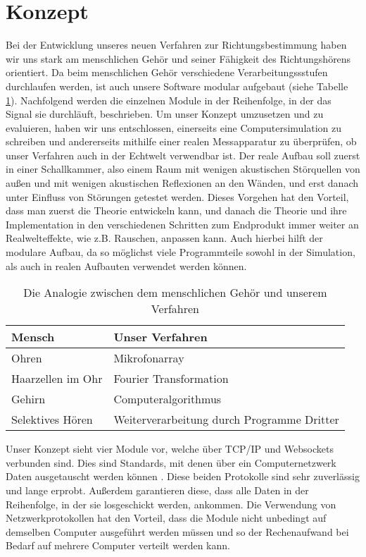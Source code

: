 \section{Konzept}
Bei der Entwicklung unseres neuen Verfahren zur Richtungsbestimmung haben wir uns stark am menschlichen Gehör und seiner Fähigkeit des Richtungshörens orientiert. Da beim menschlichen Gehör verschiedene Verarbeitungssstufen durchlaufen werden, ist auch unsere Software modular aufgebaut (siehe Tabelle \ref{analog}). Nachfolgend werden die einzelnen Module in der Reihenfolge, in der das Signal sie durchläuft, beschrieben. 
Um unser Konzept umzusetzen und zu evaluieren, haben wir uns entschlossen, einerseits eine Computersimulation zu schreiben und andererseits mithilfe einer realen Messapparatur zu überprüfen, ob unser Verfahren auch in der Echtwelt verwendbar ist. Der reale Aufbau soll zuerst in einer Schallkammer, also einem Raum mit wenigen akustischen Störquellen von außen und mit wenigen akustischen Reflexionen an den Wänden, und erst danach unter Einfluss von Störungen getestet werden. Dieses Vorgehen hat den Vorteil, dass man zuerst die Theorie entwickeln kann, und danach die Theorie und ihre Implementation in den verschiedenen Schritten zum Endprodukt immer weiter an Realwelteffekte, wie z.B. Rauschen, anpassen kann. Auch hierbei hilft der modulare Aufbau, da so möglichst viele Programmteile sowohl in der Simulation, als auch in realen Aufbauten verwendet werden können.
\begin{table}[h]
	\centering
    \begin{tabular}{ll}
		Mensch            & Unser Verfahren                                   \\ \hline
        Ohren             & Mikrofonarray                              \\
        Haarzellen im Ohr & Fourier Transformation                     \\
        Gehirn            & Computeralgorithmus                        \\
		Selektives Hören  & Weiterverarbeitung durch Programme Dritter
	\end{tabular}
	\caption{Die Analogie zwischen dem menschlichen Gehör und unserem Verfahren}
	\label{analog}
\end{table}
Unser Konzept sieht vier Module vor, welche über TCP/IP und Websockets verbunden sind. Dies sind Standards, mit denen über ein Computernetzwerk Daten ausgetauscht werden können \cite{tcp} \cite{websockets}. Diese beiden Protokolle sind sehr zuverlässig und lange erprobt. Außerdem garantieren diese, dass alle Daten in der Reihenfolge, in der sie losgeschickt werden, ankommen. Die Verwendung von Netzwerkprotokollen hat den Vorteil, dass die Module nicht unbedingt auf demselben Computer ausgeführt werden müssen und so der Rechenaufwand bei Bedarf auf mehrere Computer verteilt werden kann.

